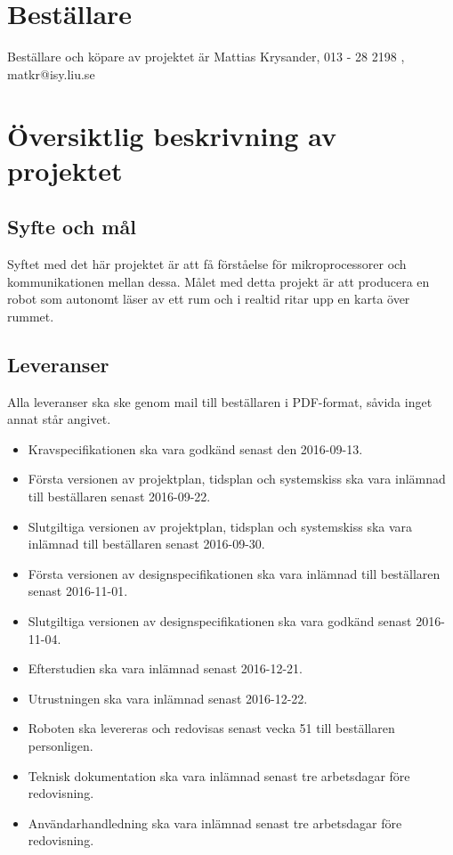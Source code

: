\documentclass{article}
\begin{document}
\renewcommand*\contentsname{Innehållsförteckning}
\tableofcontents
\clearpage

\section{Beställare}
Beställare och köpare av projektet är Mattias Krysander, 013 - 28 2198 , matkr@isy.liu.se

\section{Översiktlig beskrivning av projektet}

\subsection{Syfte och mål}
Syftet med det här projektet är att få förståelse för mikroprocessorer och kommunikationen mellan
dessa. Målet med detta projekt är att producera en robot som autonomt läser av ett rum och i realtid  ritar upp en karta över rummet.

\subsection{Leveranser}
Alla leveranser ska ske genom mail till beställaren i PDF-format, såvida inget annat står angivet. 

\begin{itemize}
    \item Kravspecifikationen ska vara godkänd senast den 2016-09-13. 
    \item Första versionen av projektplan, tidsplan och systemskiss ska vara inlämnad till beställaren senast 2016-09-22. 
    \item Slutgiltiga versionen av projektplan, tidsplan och systemskiss ska vara inlämnad till beställaren senast 2016-09-30. 
    \item Första versionen av designspecifikationen ska vara inlämnad till beställaren senast 2016-11-01. 
    \item Slutgiltiga versionen av designspecifikationen ska vara godkänd senast 2016-11-04.
    \item Efterstudien ska vara inlämnad senast 2016-12-21. 
    \item Utrustningen ska vara inlämnad senast 2016-12-22.
    \item Roboten ska levereras och redovisas senast vecka 51 till beställaren personligen.
    \item Teknisk dokumentation ska vara inlämnad senast tre arbetsdagar före redovisning.
    \item Användarhandledning ska vara inlämnad senast tre arbetsdagar före redovisning.
\end{itemize}
\end{document}
